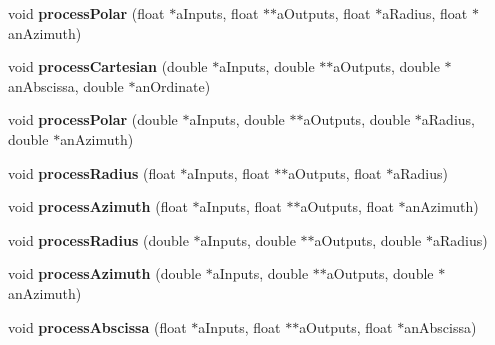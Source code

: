 \begin{DoxyCompactItemize}
\item 
\hypertarget{class_ambisonics_multi_maps_a986adc7a6d8995d9ac395c7f52ef3d9c}{void {\bfseries process\-Polar} (float $\ast$a\-Inputs, float $\ast$$\ast$a\-Outputs, float $\ast$a\-Radius, float $\ast$an\-Azimuth)}\label{class_ambisonics_multi_maps_a986adc7a6d8995d9ac395c7f52ef3d9c}

\item 
\hypertarget{class_ambisonics_multi_maps_acfa354e1fd81fd6c650e292e5f839611}{void {\bfseries process\-Cartesian} (double $\ast$a\-Inputs, double $\ast$$\ast$a\-Outputs, double $\ast$an\-Abscissa, double $\ast$an\-Ordinate)}\label{class_ambisonics_multi_maps_acfa354e1fd81fd6c650e292e5f839611}

\item 
\hypertarget{class_ambisonics_multi_maps_ab689ee70c21056307ef196ac12d90476}{void {\bfseries process\-Polar} (double $\ast$a\-Inputs, double $\ast$$\ast$a\-Outputs, double $\ast$a\-Radius, double $\ast$an\-Azimuth)}\label{class_ambisonics_multi_maps_ab689ee70c21056307ef196ac12d90476}

\item 
\hypertarget{class_ambisonics_multi_maps_a26f8c22035a34dff197100daae26c5e5}{void {\bfseries process\-Radius} (float $\ast$a\-Inputs, float $\ast$$\ast$a\-Outputs, float $\ast$a\-Radius)}\label{class_ambisonics_multi_maps_a26f8c22035a34dff197100daae26c5e5}

\item 
\hypertarget{class_ambisonics_multi_maps_a0ab8bc9f6938c9632416042ed63fa871}{void {\bfseries process\-Azimuth} (float $\ast$a\-Inputs, float $\ast$$\ast$a\-Outputs, float $\ast$an\-Azimuth)}\label{class_ambisonics_multi_maps_a0ab8bc9f6938c9632416042ed63fa871}

\item 
\hypertarget{class_ambisonics_multi_maps_a61a1cbcd47f04fddcb0124d9e81bef55}{void {\bfseries process\-Radius} (double $\ast$a\-Inputs, double $\ast$$\ast$a\-Outputs, double $\ast$a\-Radius)}\label{class_ambisonics_multi_maps_a61a1cbcd47f04fddcb0124d9e81bef55}

\item 
\hypertarget{class_ambisonics_multi_maps_af4272974aa583e88c9aba336235fb2ec}{void {\bfseries process\-Azimuth} (double $\ast$a\-Inputs, double $\ast$$\ast$a\-Outputs, double $\ast$an\-Azimuth)}\label{class_ambisonics_multi_maps_af4272974aa583e88c9aba336235fb2ec}

\item 
\hypertarget{class_ambisonics_multi_maps_a51869549f420dd06dcf75c7072b4b2d7}{void {\bfseries process\-Abscissa} (float $\ast$a\-Inputs, float $\ast$$\ast$a\-Outputs, float $\ast$an\-Abscissa)}\label{class_ambisonics_multi_maps_a51869549f420dd06dcf75c7072b4b2d7}


\end{DoxyCompactItemize}
